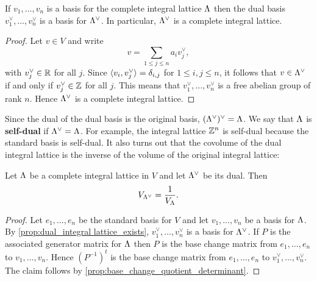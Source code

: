     \begin{proposition}\label{prop:dual_integral lattice_exists}
      If $v_{1},\ldots,v_{n}$ is a basis for the complete integral lattice $\Lambda$ then the dual basis $v_{1}^{\vee},\ldots,v_{n}^{\vee}$ is a basis for $\Lambda^{\vee}$. In particular, $\Lambda^{\vee}$ is a complete integral lattice.
    \end{proposition}
    \begin{proof}
      Let $v \in V$ and write
      \[
        v = \sum_{1 \le j \le n}a_{i}v_{j}^{\vee},
      \]
      with $v_{j}^{\vee} \in \mathbb{R}$ for all $j$. Since $\langle v_{i},v_{j}^{\vee}\rangle = \delta_{i,j}$ for $1 \le i,j \le n$, it follows that $v \in \Lambda^{\vee}$ if and only if $v_{j}^{\vee} \in \mathbb{Z}$ for all $j$. This means that $v_{1}^{\vee},\ldots,v_{n}^{\vee}$ is a free abelian group of rank $n$. Hence $\Lambda^{\vee}$ is a complete integral lattice.
    \end{proof}

    Since the dual of the dual basis is the original basis, $(\Lambda^{\vee})^{\vee} = \Lambda$. We say that $\Lambda$ is \textbf{self-dual} if $\Lambda^{\vee} = \Lambda$. For example, the integral lattice $\mathbb{Z}^{n}$ is self-dual because the standard basis is self-dual. It also turns out that the covolume of the dual integral lattice is the inverse of the volume of the original integral lattice:

    \begin{proposition}\label{prop:covolume_of_dual_is_inverse}
      Let $\Lambda$ be a complete integral lattice in $V$ and let $\Lambda^{\vee}$ be its dual. Then
      \[
        V_{\Lambda^{\vee}} = \frac{1}{V_{\Lambda}}.
      \]
    \end{proposition}
    \begin{proof}
      Let $e_{1},\ldots,e_{n}$ be the standard basis for $V$ and let $v_{1},\ldots,v_{n}$ be a basis for $\Lambda$. By \cref{prop:dual_integral lattice_exists}, $v_{1}^{\vee},\ldots,v_{n}^{\vee}$ is a basis for $\Lambda^{\vee}$. If $P$ is the associated generator matrix for $\Lambda$ then $P$ is the base change matrix from $e_{1},\ldots,e_{n}$ to $v_{1},\ldots,v_{n}$. Hence $(P^{-1})^{t}$ is the base change matrix from $e_{1},\ldots,e_{n}$ to $v_{1}^{\vee},\ldots,v_{n}^{\vee}$. The claim follows by \cref{prop:base_change_quotient_determinant}.
    \end{proof}
    
